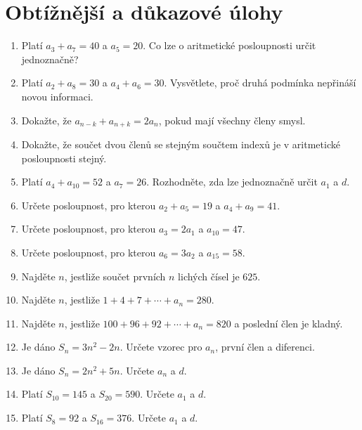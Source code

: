 \documentclass[11pt,a4paper]{article}
\begin{document}
\section*{Obtížnější a důkazové úlohy}

\begin{enumerate}[resume]
    \item Platí $a_3+a_7=40$ a $a_5=20$. Co lze o aritmetické posloupnosti určit jednoznačně?

    \item Platí $a_2+a_8=30$ a $a_4+a_6=30$. Vysvětlete, proč druhá podmínka nepřináší novou informaci.

    \item Dokažte, že $a_{n-k}+a_{n+k}=2a_n$, pokud mají všechny členy smysl.

    \item Dokažte, že součet dvou členů se stejným součtem indexů je v aritmetické posloupnosti stejný.

    \item Platí $a_4+a_{10}=52$ a $a_7=26$. Rozhodněte, zda lze jednoznačně určit $a_1$ a $d$.

    \item Určete posloupnost, pro kterou $a_2+a_5=19$ a $a_4+a_9=41$.

    \item Určete posloupnost, pro kterou $a_3=2a_1$ a $a_{10}=47$.

    \item Určete posloupnost, pro kterou $a_6=3a_2$ a $a_{15}=58$.

    \item Najděte $n$, jestliže součet prvních $n$ lichých čísel je $625$.

    \item Najděte $n$, jestliže $1+4+7+\cdots+a_n=280$.

    \item Najděte $n$, jestliže $100+96+92+\cdots+a_n=820$ a poslední člen je kladný.

    \item Je dáno $S_n=3n^2-2n$. Určete vzorec pro $a_n$, první člen a diferenci.

    \item Je dáno $S_n=2n^2+5n$. Určete $a_n$ a $d$.

    \item Platí $S_{10}=145$ a $S_{20}=590$. Určete $a_1$ a $d$.

    \item Platí $S_8=92$ a $S_{16}=376$. Určete $a_1$ a $d$.
\end{enumerate}
\end{document}
